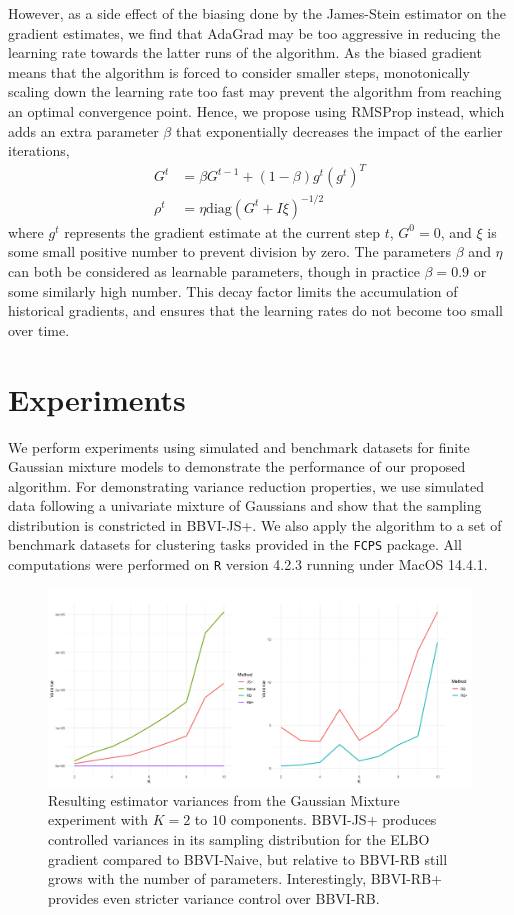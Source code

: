 \documentclass{article}
\begin{document}
However, as a side effect of the biasing done by the James-Stein estimator on the gradient estimates, we find that AdaGrad may be too aggressive in reducing the learning rate towards the latter runs of the algorithm. As the biased gradient means that the algorithm is forced to consider smaller steps, monotonically scaling down the learning rate too fast may prevent the algorithm from reaching an optimal convergence point. Hence, we propose using RMSProp \cite{Goodfellow-2016} instead, which adds an extra parameter $\beta$ that exponentially decreases the impact of the earlier iterations,
\begin{align*}
    G^t & = \beta G^{t-1} + (1 - \beta)g^t(g^t)^T \\
    \rho^t & = \eta \text{diag}(G^t + I \xi)^{-1/2}
\end{align*}
where $g^t$ represents the gradient estimate at the current step $t$, $G^0 = 0$, and $\xi$ is some small positive number to prevent division by zero. The parameters $\beta$ and $\eta$ can both be considered as learnable parameters, though in practice $\beta = 0.9$ or some similarly high number. This decay factor limits the accumulation of historical gradients, and ensures that the learning rates do not become too small over time.

\section{Experiments}
\label{sec:gausmix}

We perform experiments using simulated and benchmark datasets for finite Gaussian mixture models to demonstrate the performance of our proposed algorithm. For demonstrating variance reduction properties, we use simulated data following a univariate mixture of Gaussians and show that the sampling distribution is constricted in BBVI-JS+. We also apply the algorithm to a set of benchmark datasets for clustering tasks provided in the \texttt{FCPS} \cite{FCPS} package. All computations were performed on \texttt{R} version 4.2.3 running under MacOS 14.4.1.

\begin{figure}[ht]
  \centering
  \includegraphics[width= 1 \linewidth]{variances.png}
  \caption{\label{fig:variances} Resulting estimator variances from the Gaussian Mixture experiment with $K = 2$ to $10$ components. BBVI-JS+ produces controlled variances in its sampling distribution for the ELBO gradient compared to BBVI-Naive, but relative to BBVI-RB still grows with the number of parameters. Interestingly, BBVI-RB+ provides even stricter variance control over BBVI-RB.}
\end{figure}
\end{document}
